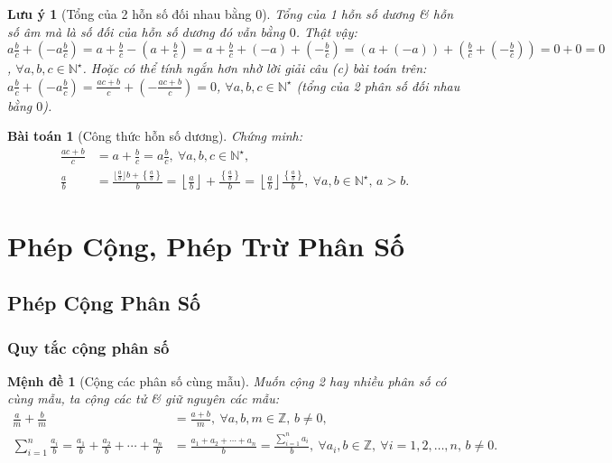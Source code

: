 \documentclass{article}
\newtheorem{baitoan}{Bài toán}
\newtheorem{luuy}{Lưu ý}
\newtheorem{menhde}{Mệnh đề}
\begin{document}
\begin{luuy}[Tổng của 2 hỗn số đối nhau bằng $0$]
	Tổng của 1 hỗn số dương \& hỗn số âm mà là số đối của hỗn số dương đó vẫn bằng $0$. Thật vậy: $a\frac{b}{c} + \left(-a\frac{b}{c}\right) = a + \frac{b}{c} - \left(a + \frac{b}{c}\right) = a + \frac{b}{c} + (-a) + \left(-\frac{b}{c}\right) = (a + (-a)) + \left(\frac{b}{c} + \left(-\frac{b}{c}\right)\right) = 0 + 0 = 0$, $\forall a,b,c\in\mathbb{N}^\star$. Hoặc có thể tính ngắn hơn nhờ lời giải câu (c) bài toán trên: $a\frac{b}{c} + \left(-a\frac{b}{c}\right) = \frac{ac + b}{c} +\left(-\frac{ac + b}{c}\right) = 0$, $\forall a,b,c\in\mathbb{N}^\star$ (tổng của 2 phân số đối nhau bằng $0$).
\end{luuy}

\begin{baitoan}[Công thức hỗn số dương]
	Chứng minh:
	\begin{align*}
		\frac{ac + b}{c} &= a + \frac{b}{c} = a\frac{b}{c},\ \forall a,b,c\in\mathbb{N}^\star,\\
		\frac{a}{b} &= \frac{\lfloor\frac{a}{b}\rfloor b + \left\{\frac{a}{b}\right\}}{b} = \left\lfloor\frac{a}{b}\right\rfloor + \frac{\left\{\frac{a}{b}\right\}}{b} = \left\lfloor\frac{a}{b}\right\rfloor\frac{\left\{\frac{a}{b}\right\}}{b},\ \forall a,b\in\mathbb{N}^\star,\, a > b.
	\end{align*}
\end{baitoan}


\section{Phép Cộng, Phép Trừ Phân Số}

\subsection{Phép Cộng Phân Số}

\subsubsection{Quy tắc cộng phân số}

\begin{menhde}[Cộng các phân số cùng mẫu]
	Muốn cộng 2 hay nhiều phân số có cùng mẫu, ta cộng các tử \& giữ nguyên các mẫu:
	\begin{align*}
		\frac{a}{m} + \frac{b}{m} &= \frac{a + b}{m},\ \forall a,b,m\in\mathbb{Z},\,b\ne0,\\
		\sum_{i=1}^n \frac{a_i}{b} = \frac{a_1}{b} + \frac{a_2}{b} + \cdots + \frac{a_n}{b} &= \frac{a_1 + a_2 + \cdots + a_n}{b} = \frac{\sum_{i=1}^n a_i}{b},\ \forall a_i,b\in\mathbb{Z},\ \forall i = 1,2,\ldots,n,\,b\ne0.
	\end{align*}
\end{menhde}
\end{document}
